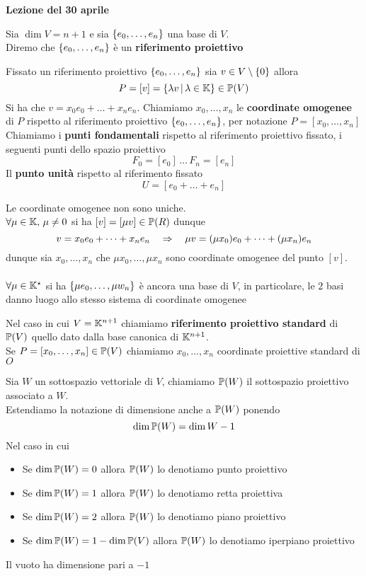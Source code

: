 

\textbf{Lezione del 30 aprile}
\begin{defn}Sia $\dim V = n+1$ e sia $\left\{ e_0, \dots, e_n \right\}$ una base di $V$.\\
Diremo che $\left\{ e_0, \dots,e_n \right\}$ \`e un \textbf{riferimento proiettivo}
\end{defn}
Fissato un riferimento proiettivo $\left\{ e_0, \dots, e_n \right\}$ sia $v\in V \setminus\left\{ 0 \right\}$ allora 
$$ P = [v] = \left\{ \lambda v \, \vert \, \lambda\in \mathbb{K} \right\} \in \mathbb{P}(V)$$
Si ha che $v=x_0e_0+\dots + x_n e_n$. Chiamiamo $x_0, \dots, x_n$ le \textbf{ coordinate omogenee } di $P$ rispetto al riferimento proiettivo $\left\{ e_0, \dots, e_n \right\}$, per notazione $P=[x_0, \dots, x_n]$\\
Chiamiamo i \textbf{ punti fondamentali } rispetto al riferimento proiettivo fissato, i seguenti punti dello spazio proiettivo
$$ F_0=[e_0]\, \dots \, F_n = [e_n]$$
Il \textbf{ punto unit\`a }  rispetto al riferimento fissato 
$$ U = [ e_0+\dots + e_n]$$
\begin{oss}Le coordinate omogenee non sono uniche.\\
$\forall \mu \in \mathbb{K}, \, \mu\neq 0$ si ha $[v]=[\mu v]\in \mathbb{P}(R)$ dunque
$$ v=x_0e_0+\dots + x_n e_n \quad \Rightarrow \quad \mu v =(\mu x_0) e_0+\dots + (\mu x_n) e_n$$
dunque sia $x_0, \dots, x_n$ che $\mu x_0, \dots , \mu x_n$ sono coordinate omogenee del punto $[v]$.\\ \\
$\forall\mu \in \mathbb{K}^\star$ si ha $\left\{ \mu e_0, \dots , \mu w_n \right\}$ \`e ancora una base di $V$, in  particolare, le $2$ basi danno luogo allo stesso sistema di coordinate omogenee
\end{oss}
\begin{defn}Nel caso in cui $V =\mathbb{K}^{n+1}$ chiamiamo \textbf{ riferimento proiettivo standard } di $\mathbb{P}(V)$  quello dato dalla base canonica di $\mathbb{K}^{n+1}$.\\
Se $P=[x_0, \dots, x_n] \in \mathbb{P}(V)$ chiamiamo $x_0, \dots, x_n$ coordinate proiettive standard di $O$
\end{defn}
\begin{defn}Sia $W$ un sottospazio vettoriale di $V$, chiamiamo $\mathbb{P}(W)$ il sottospazio proiettivo associato a $W$.\\
Estendiamo la notazione di dimensione anche a $\mathbb{P}(W)$ ponendo 
$$ \dim \mathbb{P}(W) = \dim W -1 $$
Nel caso in cui
\begin{itemize}
\item Se $\dim \mathbb{P}(W) = 0$ allora $\mathbb{P}(W)$ lo denotiamo punto  proiettivo
\item Se $\dim \mathbb{P}(W) = 1$ allora $\mathbb{P}(W)$ lo denotiamo retta proiettiva
\item Se $\dim \mathbb{P}(W) =2$  allora $\mathbb{P}(W)$ lo denotiamo piano  proiettivo
\item Se $\dim \mathbb{P}(W) =1-\dim \mathbb{P}(V)$ allora $\mathbb{P}(W)$ lo denotiamo iperpiano proiettivo
\end{itemize}
\begin{oss}Il vuoto ha dimensione pari a $-1$
\end{oss}
\end{defn}
